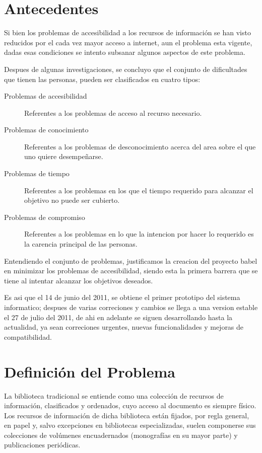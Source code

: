 \documentclass[letter,12pt]{article}
\begin{document}
\section{Antecedentes}
Si bien los problemas de accesibilidad a los recursos de información se han visto reducidos
por el cada vez mayor acceso a internet, aun el problema esta vigente, dadas esas
condiciones se intento subsanar algunos aspectos de este problema.

Despues de algunas investigaciones, se concluyo que el conjunto de dificultades que tienen
las personas, pueden ser clasificados en cuatro tipos:

\begin{description}
\item [Problemas de accesibilidad] Referentes a los problemas de acceso al recurso
necesario.
\item [Problemas de conocimiento] Referentes a los problemas de desconocimiento acerca del 
area sobre el que uno quiere desempeñarse.
\item [Problemas de tiempo] Referentes a los problemas en los que el tiempo requerido para
alcanzar el objetivo no puede ser cubierto.
\item [Problemas de compromiso] Referentes a los problemas en lo que la intencion por hacer
lo requerido es la carencia principal de las personas.
\end{description}

Entendiendo el conjunto de problemas, justificamos la creacion del proyecto babel en minimizar los problemas de accesibilidad, siendo esta la primera barrera que se tiene al intentar alcanzar los objetivos deseados.

Es asi que el 14 de junio del 2011, se obtiene el primer prototipo del sistema informatico; despues de varias correciones y cambios se llega a una version estable el 27 de julio del
2011, de ahi en adelante se siguen desarrollando hasta la actualidad, ya sean correciones urgentes, nuevas funcionalidades y mejoras de compatibilidad.

\section{Definición del Problema}
La biblioteca tradicional se entiende como una colección de recursos de información,
clasificados y ordenados, cuyo acceso al documento es siempre físico. Los recursos de
información de dicha biblioteca están fijados, por regla general, en papel y, salvo
excepciones en bibliotecas especializadas, suelen componerse sus colecciones de volúmenes
encuadernados (monografías en su mayor parte) y publicaciones periódicas.
\end{document}
